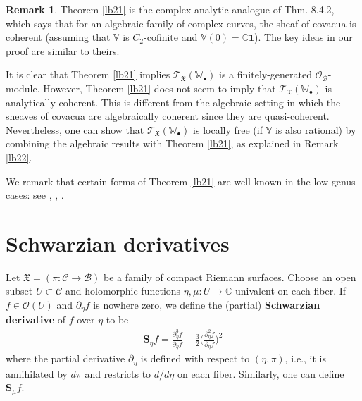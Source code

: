 \documentclass[11pt,b5paper,notitlepage]{article}
\theoremstyle{definition}
\newtheorem{rem}[df]{Remark}
\theoremstyle{plain}
\newcommand{\fk}{\mathfrak}
\newcommand{\mc}{\mathcal}
\newcommand{\id}{\mathbf{1}}
\newcommand{\scr}{\mathscr}
\newcommand{\blt}{\bullet}
\newcommand{\Vbb}{\mathbb V}
\newcommand{\Wbb}{\mathbb W}
\newcommand{\Cbb}{\mathbb C}
\newcommand{\Sbf}{\mathbf{S}}
\numberwithin{equation}{section}
\begin{document}
\begin{rem}\label{lb54}
Theorem \ref{lb21} is the complex-analytic analogue of \cite{DGT19b} Thm. 8.4.2, which says that for an algebraic family of complex curves, the sheaf of covacua is coherent (assuming that $\Vbb$ is $C_2$-cofinite and $\Vbb(0)=\Cbb\id$). The key ideas in our proof are similar to theirs.

It is clear that Theorem \ref{lb21} implies $\scr T_{\fk X}(\Wbb_\blt)$ is a finitely-generated $\scr O_{\mc B}$-module. However,  Theorem \ref{lb21} does not seem to imply that $\scr T_{\fk X}(\Wbb_\blt)$ is analytically coherent. This is different from the algebraic setting in  which the sheaves of covacua are algebraically coherent since they are quasi-coherent. Nevertheless, one can show that $\scr T_{\fk X}(\Wbb_\blt)$ is locally free (if $\Vbb$ is also rational)  by combining  the algebraic results with Theorem \ref{lb21}, as explained in Remark \ref{lb22}. 




We remark that certain forms of Theorem \ref{lb21} are well-known in the  low genus cases: see \cite[Lemma 4.4.1]{Zhu96}, \cite[Cor. 1.2]{Hua05a}, \cite[Cor. 3.4]{Hua05b}. 
\end{rem}







\section{Schwarzian derivatives}

Let $\fk X=(\pi:\mc C\rightarrow\mc B)$ be a family of compact Riemann surfaces.  Choose an open subset $U\subset \mc C$ and holomorphic functions $\eta,\mu:U\rightarrow\Cbb$ univalent on each fiber. If $f\in\scr O(U)$ and $\partial_\eta f$ is nowhere zero, we define the (partial) \textbf{Schwarzian derivative} of $f$ over $\eta$ to be \index{S@$\Sbf_\eta f,\Sbf_\eta\fk P$}
\begin{align}
\Sbf_\eta f=\frac{\partial_\eta^3f}{\partial_\eta f}-\frac 32 \Big(\frac{\partial_\eta^2f}{\partial_\eta f} \Big)^2
\end{align}
where the partial derivative $\partial_\eta$ is defined with respect to $(\eta,\pi)$, i.e., it is annihilated by $d\pi$ and restricts to $d/d\eta$ on each fiber. Similarly, one can define $\Sbf_\mu f$. 
\end{document}
